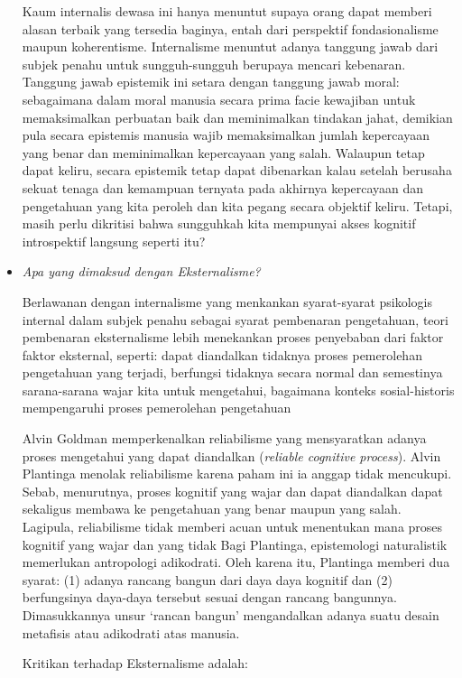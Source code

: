 \documentclass[10pt,a4paper]{article}
\begin{document}
\begin{multicols}{2}
\begin{itemize}
  Kaum internalis dewasa ini hanya menuntut supaya orang dapat memberi
  alasan terbaik yang tersedia baginya, entah dari perspektif
  fondasionalisme maupun koherentisme. Internalisme menuntut adanya
  tanggung jawab dari subjek penahu untuk sungguh-sungguh berupaya
  mencari kebenaran. Tanggung jawab epistemik ini setara dengan tanggung
  jawab moral: sebagaimana dalam moral manusia secara prima facie
  kewajiban untuk memaksimalkan perbuatan baik dan meminimalkan tindakan
  jahat, demikian pula secara epistemis manusia wajib memaksimalkan
  jumlah kepercayaan yang benar dan meminimalkan kepercayaan yang salah.
  Walaupun tetap dapat keliru, secara epistemik tetap dapat dibenarkan
  kalau setelah berusaha sekuat tenaga dan kemampuan ternyata pada
  akhirnya kepercayaan dan pengetahuan yang kita peroleh dan kita pegang
  secara objektif keliru. Tetapi, masih perlu dikritisi bahwa sungguhkah
  kita mempunyai akses kognitif introspektif langsung seperti itu?
\item
  \emph{Apa yang dimaksud dengan Eksternalisme?}

  Berlawanan dengan internalisme yang menkankan syarat-syarat psikologis
  internal dalam subjek penahu sebagai syarat pembenaran pengetahuan,
  teori pembenaran eksternalisme lebih menekankan proses penyebaban dari
  faktor faktor eksternal, seperti: dapat diandalkan tidaknya proses
  pemerolehan pengetahuan yang terjadi, berfungsi tidaknya secara normal
  dan semestinya sarana-sarana wajar kita untuk mengetahui, bagaimana
  konteks sosial-historis mempengaruhi proses pemerolehan pengetahuan

  Alvin Goldman memperkenalkan reliabilisme yang mensyaratkan adanya
  proses mengetahui yang dapat diandalkan (\emph{reliable cognitive
  process}). Alvin Plantinga menolak reliabilisme karena paham ini ia
  anggap tidak mencukupi. Sebab, menurutnya, proses kognitif yang wajar
  dan dapat diandalkan dapat sekaligus membawa ke pengetahuan yang benar
  maupun yang salah. Lagipula, reliabilisme tidak memberi acuan untuk
  menentukan mana proses kognitif yang wajar dan yang tidak Bagi
  Plantinga, epistemologi naturalistik memerlukan antropologi
  adikodrati. Oleh karena itu, Plantinga memberi dua syarat: (1) adanya
  rancang bangun dari daya daya kognitif dan (2) berfungsinya daya-daya
  tersebut sesuai dengan rancang bangunnya. Dimasukkannya unsur `rancan
  bangun' mengandalkan adanya suatu desain metafisis atau adikodrati
  atas manusia.

  Kritikan terhadap Eksternalisme adalah:


\end{itemize}
\end{multicols}
\end{document}

